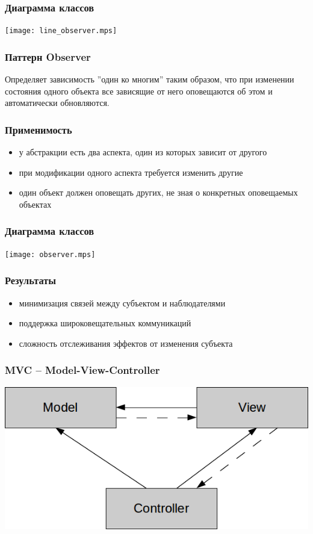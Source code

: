 \documentclass[handout]{beamer}
\begin{document}
\begin{frame}[fragile]
\frametitle{Диаграмма классов}
\begin{center}
\texttt{[image: line\_observer.mps]}
\end{center}
\end{frame}


\begin{frame}[fragile]
\frametitle{Паттерн Observer}
Определяет зависимость ''один ко многим'' таким образом, что при изменении состояния
одного объекта все зависящие от него оповещаются об этом и автоматически обновляются.
\end{frame}


\begin{frame}[fragile]
\frametitle{Применимость}
\begin{itemize}
\item у абстракции есть два аспекта, один из которых зависит от другого
\item при модификации одного аспекта требуется изменить другие
\item один объект должен оповещать других, не зная о конкретных оповещаемых объектах
\end{itemize}
\end{frame}



\begin{frame}[fragile]
\frametitle{Диаграмма классов}
\begin{center}
\texttt{[image: observer.mps]}
\end{center}
\end{frame}



\begin{frame}[fragile]
\frametitle{Результаты}
\begin{itemize}
\item минимизация связей между субъектом и наблюдателями
\item поддержка широковещательных коммуникаций
\item сложность отслеживания эффектов от изменения субъекта
\end{itemize}
\end{frame}


\begin{frame}[fragile]
\frametitle{MVC -- Model-View-Controller}
\begin{center}
\includegraphics[scale=0.4]{mvc.png}
\end{center}
\end{frame}
\end{document}
